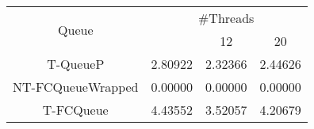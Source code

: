 \begin{tabular}{|c|c|c|c|}
\hline
\multirow{2}{*}{Queue} & \multicolumn{3}{c|}{\#Threads}\\\cline{2-4}& \quad 4 & 12 & 20\\
\hline
\hline
T-QueueP & 2.80922 & 2.32366 & 2.44626\\
NT-FCQueueWrapped & 0.00000 & 0.00000 & 0.00000\\
T-FCQueue & 4.43552 & 3.52057 & 4.20679\\
\hline\end{tabular}

